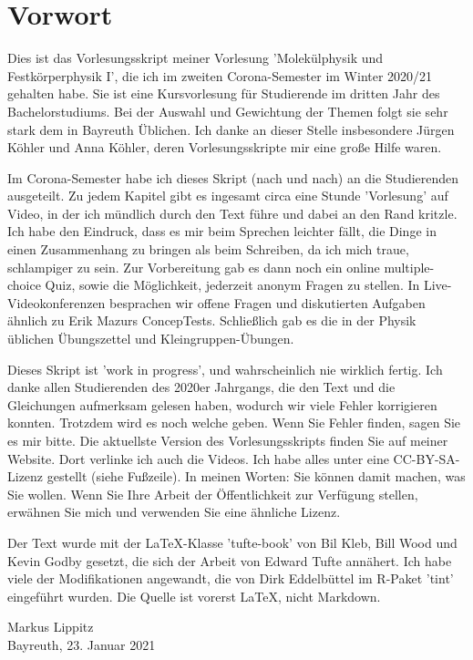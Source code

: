 \renewcommand{\lastmod}{\ \ }
\renewcommand{\chapterauthors}{\ \ }

\chapter*{Vorwort}

Dies ist das Vorlesungsskript meiner Vorlesung 'Molekülphysik und Festkörperphysik I', die ich im zweiten Corona-Semester im Winter 2020/21 gehalten habe. Sie ist eine Kursvorlesung für  Studierende im dritten Jahr des Bachelorstudiums. Bei der Auswahl und Gewichtung der Themen folgt sie sehr stark dem in Bayreuth Üblichen. Ich danke an dieser Stelle insbesondere Jürgen Köhler und Anna Köhler, deren Vorlesungsskripte mir eine große Hilfe waren.


Im Corona-Semester habe ich dieses Skript (nach und nach) an die Studierenden  ausgeteilt. Zu jedem Kapitel gibt es ingesamt circa eine Stunde 'Vorlesung' auf Video, in der ich mündlich durch den Text führe und dabei an den Rand kritzle.
Ich habe den Eindruck, dass es mir beim Sprechen leichter fällt, die Dinge in einen Zusammenhang zu bringen als beim Schreiben, da ich mich traue, schlampiger zu sein. Zur Vorbereitung gab es dann noch ein online multiple-choice Quiz, sowie die Möglichkeit, jederzeit anonym Fragen zu stellen.  In Live-Videokonferenzen besprachen wir offene Fragen und diskutierten Aufgaben ähnlich zu Erik Mazurs 
ConcepTests.  Schließlich gab es die in der Physik üblichen Übungszettel und Kleingruppen-Übungen.



Dieses Skript ist 'work in progress', und wahrscheinlich nie wirklich fertig.  Ich danke allen Studierenden des 2020er Jahrgangs, die den Text und die Gleichungen aufmerksam gelesen haben, wodurch wir viele Fehler korrigieren konnten. Trotzdem wird es noch welche geben. Wenn Sie Fehler finden, sagen Sie es mir bitte. 
Die aktuellste Version des Vorlesungsskripts finden Sie auf meiner 
Website. Dort verlinke ich auch die Videos. Ich habe alles unter eine CC-BY-SA-Lizenz gestellt (siehe Fußzeile). In meinen Worten: Sie können damit machen, was Sie wollen. Wenn Sie Ihre Arbeit der Öffentlichkeit zur Verfügung stellen, erwähnen Sie mich und verwenden Sie eine ähnliche Lizenz. 


Der Text wurde mit der LaTeX-Klasse 'tufte-book' von Bil Kleb, Bill Wood und Kevin Godby gesetzt, die sich der Arbeit von Edward Tufte annähert. Ich habe viele der Modifikationen angewandt, die von Dirk Eddelbüttel im R-Paket 'tint' eingeführt wurden. Die Quelle ist vorerst LaTeX, nicht Markdown.




\vspace{2\baselineskip}

Markus Lippitz \\ Bayreuth, 23. Januar 2021

 
 



